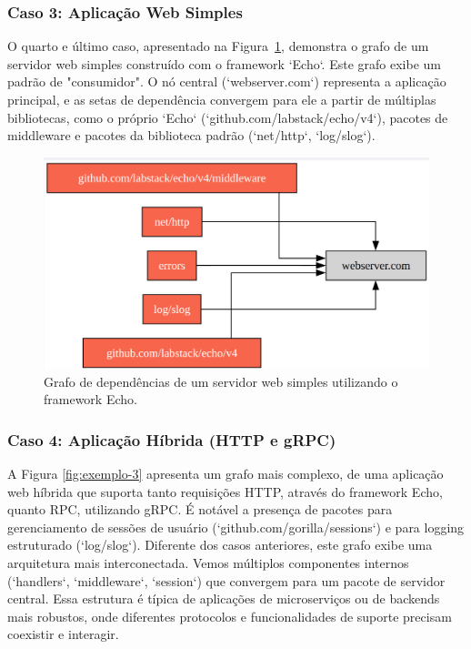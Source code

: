 \documentclass[12pt]{article}
\begin{document}
\subsubsection{Caso 3: Aplicação Web Simples}
O quarto e último caso, apresentado na Figura~\ref{fig:exemplo-4}, demonstra o grafo de um servidor web simples construído com o framework `Echo`. Este grafo exibe um padrão de "consumidor". O nó central (`webserver.com`) representa a aplicação principal, e as setas de dependência convergem para ele a partir de múltiplas bibliotecas, como o próprio `Echo` (`github.com/labstack/echo/v4`), pacotes de middleware e pacotes da biblioteca padrão (`net/http`, `log/slog`).

\begin{figure}[htbp]
\centering
\includegraphics[width=1\textwidth]{examples/webserver.png}
\caption{Grafo de dependências de um servidor web simples utilizando o framework Echo.}
\label{fig:exemplo-4}
\end{figure}

\subsubsection{Caso 4: Aplicação Híbrida (HTTP e gRPC)}
A Figura \ref{fig:exemplo-3} apresenta um grafo mais complexo, de uma aplicação web híbrida que suporta tanto requisições HTTP, através do framework Echo, quanto RPC, utilizando gRPC. É notável a presença de pacotes para gerenciamento de sessões de usuário (`github.com/gorilla/sessions`) e para logging estruturado (`log/slog`). Diferente dos casos anteriores, este grafo exibe uma arquitetura mais interconectada. Vemos múltiplos componentes internos (`handlers`, `middleware`, `session`) que convergem para um pacote de servidor central. Essa estrutura é típica de aplicações de microserviços ou de backends mais robustos, onde diferentes protocolos e funcionalidades de suporte precisam coexistir e interagir.
\end{document}
